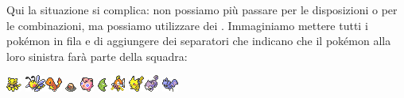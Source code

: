 \documentclass{article}     %
\begin{document}
            \begin{ex}

            Qui la situazione si complica: non possiamo più passare per le disposizioni o per le combinazioni, ma possiamo utilizzare dei . Immaginiamo mettere tutti i pokémon in fila e di aggiungere dei separatori \say{$|$} che indicano che il pokémon alla loro sinistra farà parte della squadra: 
            \begin{center}
                \includegraphics{pkmn/A.png} \raisebox{5pt}{$\big|$}\includegraphics{pkmn/B.png}\includegraphics{pkmn/C.png} \raisebox{5pt}{$\big|$}\raisebox{5pt}{$\big|$} \includegraphics{pkmn/D.png} \includegraphics{pkmn/J.png} \includegraphics{pkmn/M.png} \includegraphics{pkmn/MK.png} \raisebox{5pt}{$\big|$}\includegraphics{pkmn/P.png}\raisebox{5pt}{$\big|$}\raisebox{5pt}{$\big|$}\includegraphics{pkmn/R.png} \includegraphics{pkmn/Z.png}
            \end{center} 

\end{ex}
\end{document}
